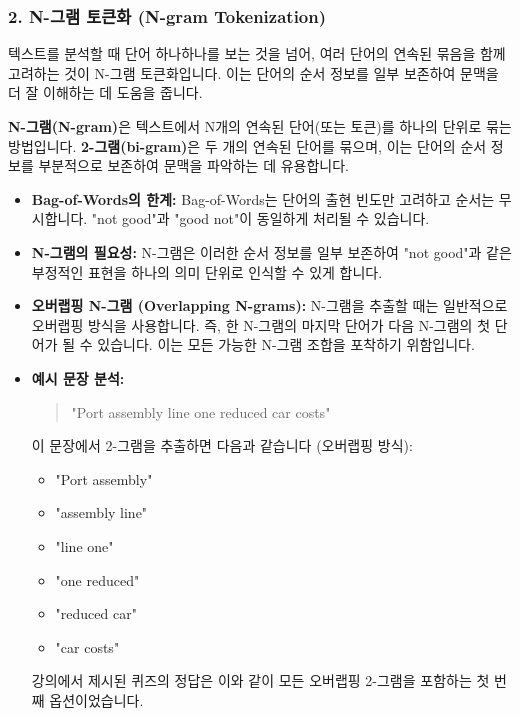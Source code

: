 \documentclass[11pt,a4paper]{article}
\begin{document}
\subsubsection*{2. N-그램 토큰화 (N-gram Tokenization)}
텍스트를 분석할 때 단어 하나하나를 보는 것을 넘어, 여러 단어의 연속된 묶음을 함께 고려하는 것이 N-그램 토큰화입니다. 이는 단어의 순서 정보를 일부 보존하여 문맥을 더 잘 이해하는 데 도움을 줍니다.

\begin{tcolorbox}[mybox, title=N-그램 토큰화의 개념]
\textbf{N-그램(N-gram)}은 텍스트에서 N개의 연속된 단어(또는 토큰)를 하나의 단위로 묶는 방법입니다.
\textbf{2-그램(bi-gram)}은 두 개의 연속된 단어를 묶으며, 이는 단어의 순서 정보를 부분적으로 보존하여 문맥을 파악하는 데 유용합니다.
\end{tcolorbox}

\begin{itemize}
    \item \textbf{Bag-of-Words의 한계:} Bag-of-Words는 단어의 출현 빈도만 고려하고 순서는 무시합니다. "not good"과 "good not"이 동일하게 처리될 수 있습니다.
    \item \textbf{N-그램의 필요성:} N-그램은 이러한 순서 정보를 일부 보존하여 "not good"과 같은 부정적인 표현을 하나의 의미 단위로 인식할 수 있게 합니다.
    \item \textbf{오버랩핑 N-그램 (Overlapping N-grams):} N-그램을 추출할 때는 일반적으로 오버랩핑 방식을 사용합니다. 즉, 한 N-그램의 마지막 단어가 다음 N-그램의 첫 단어가 될 수 있습니다. 이는 모든 가능한 N-그램 조합을 포착하기 위함입니다.
    \item \textbf{예시 문장 분석:}
    \begin{quote}
        "Port assembly line one reduced car costs"
    \end{quote}
    이 문장에서 2-그램을 추출하면 다음과 같습니다 (오버랩핑 방식):
    \begin{itemize}
        \item "Port assembly"
        \item "assembly line"
        \item "line one"
        \item "one reduced"
        \item "reduced car"
        \item "car costs"
    \end{itemize}
    강의에서 제시된 퀴즈의 정답은 이와 같이 모든 오버랩핑 2-그램을 포함하는 첫 번째 옵션이었습니다.
\end{itemize}
\end{document}

